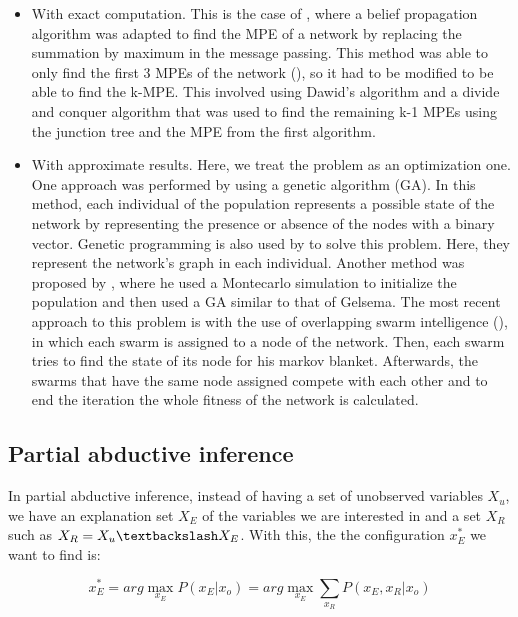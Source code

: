 \documentclass[a4paper,11pt]{article}
\begin{document}
\begin{itemize}
\item With exact computation. This is the case of \cite{dawid1992}, where a belief propagation algorithm was adapted to find the MPE of a network by replacing the summation by maximum in the message passing. This method was able to only find the first 3 MPEs of the network (\cite{nilsson1998}), so it had to be modified to be able to find the k-MPE. This involved using Dawid's algorithm and a divide and conquer algorithm that was used to find the remaining k-1 MPEs using the junction tree and the MPE from the first algorithm.

\item With approximate results. Here, we treat the problem as an optimization one. One approach was performed by \cite{gelsema1995} using a genetic algorithm (GA). In this method, each individual of the population represents a possible state of the network by representing the presence or absence of the nodes with a binary vector. Genetic programming is also used by \cite{rojas1993} to solve this problem. Here, they represent the network's graph in each individual. Another method was proposed by \cite{welch1996}, where he used a Montecarlo simulation to initialize the population and then used a GA similar to that of Gelsema. The most recent approach to this problem is with the use of overlapping swarm intelligence (\cite{fortier2013}), in which each swarm is assigned to a node of the network. Then, each swarm tries to find the state of its node for his markov blanket. Afterwards, the swarms that have the same node assigned compete with each other and to end the iteration the whole fitness of the network is calculated.
\end{itemize}

\subsection{Partial abductive inference}

In partial abductive inference, instead of having a set of unobserved variables $X_u$, we have an explanation set $X_E$ of the variables we are interested in and a set $X_R$ such as $X_R = X_u \textbackslash X_E$. With this, the the configuration $x^*_E$ we want to find is:

\begin{equation}
x^*_E = arg\max_{x_E} P(x_E | x_o) = arg\max_{x_E} \sum_{x_R}P(x_E,x_R|x_o)
\label{eqn:pMPE}
\end{equation}
\end{document}
